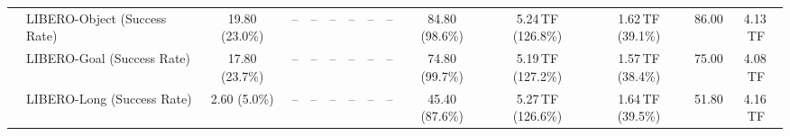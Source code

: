 \begin{table}[t]
\begin{center}
\begin{small}
\begin{sc}
{\begin{tabular}{llcccccccccccc}
& LIBERO-Object (Success Rate) & 19.80 (23.0\%) & -- & -- & -- & -- & -- & -- & \cellcolor{gray!15}84.80 (98.6\%) & 5.24\,TF (126.8\%) & 1.62\,TF (39.1\%) & 86.00 & 4.13\,TF \\
& LIBERO-Goal (Success Rate) & 17.80 (23.7\%) & -- & -- & -- & -- & -- & -- & \cellcolor{gray!15}74.80 (99.7\%) & 5.19\,TF (127.2\%) & 1.57\,TF (38.4\%) & 75.00 & 4.08\,TF \\
& LIBERO-Long (Success Rate) & 2.60 (5.0\%) & -- & -- & -- & -- & -- & -- & 45.40 (87.6\%) & 5.27\,TF (126.6\%) & 1.64\,TF (39.5\%) & 51.80 & 4.16\,TF \\
\bottomrule
\end{tabular}}
\end{sc}\end{small}\end{center}
\vspace{-0.22in}
\end{table}
